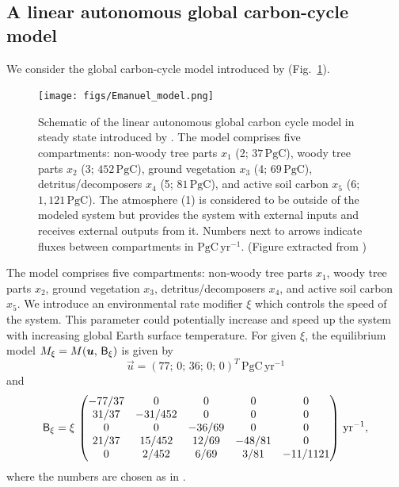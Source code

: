 \documentclass[smallextended]{svjour3}
\newcommand{\peta}{\mathrm{P}}
\newcommand{\gC}{\mathrm{gC}}
\newcommand{\yr}{\mathrm{yr}}
\newcommand{\transpose}{T}
\begin{document}
\subsection{A linear autonomous global carbon-cycle model}
\label{sec:example_1}
We consider the global carbon-cycle model introduced by \citet{Emanuel1981} (Fig.~\ref{fig:Emanuel_model}).
\begin{figure}%
    \centering
    \texttt{[image: figs/Emanuel\_model.png]}
    \caption{Schematic of the linear autonomous global carbon cycle model in steady state introduced by \citet{Emanuel1981}. 
      The model comprises five compartments: non-woody tree parts $x_1$ (2; $37\,\peta\gC$), woody tree parts $x_2$ (3; $452\,\peta\gC$), ground vegetation $x_3$ (4; $69\,\peta\gC$), detritus/decomposers $x_4$ (5; $81\,\peta\gC$), and active soil carbon $x_5$ (6; $1,121\,\peta\gC$). The atmosphere (1) is considered to be outside of the modeled system but provides the system with external inputs and receives external outputs from it. Numbers next to arrows indicate fluxes between compartments in $\peta\gC\,\yr^{-1}$. (Figure extracted from \citealt{Emanuel1981})}\label{fig:Emanuel_model}
\end{figure}
The model comprises five compartments: non-woody tree parts $x_1$, woody tree parts $x_2$, ground vegetation $x_3$, detritus/decomposers $x_4$, and active soil carbon $x_5$.
We introduce an environmental rate modifier $\xi$ which controls the speed of the system.
This parameter could potentially increase and speed up the system with increasing global Earth surface temperature.
For given $\xi$, the equilibrium model $M_\xi=M(\vec{u},\,\tens{B}_\xi)$ is given by
\begin{equation*}
  \vec{u} = (77;\,0;\,36;\,0;\,0)^{\transpose}\, \peta\gC\,\yr^{-1}
\end{equation*}
and
\begin{equation*}
    \tens{B}_\xi = \xi\,\left(\begin{matrix}
      -77/37 &       0 &      0 &      0 & 	  0\\
       31/37 & -31/452 &      0 &      0 & 	  0\\
	   0 &       0 & -36/69 &      0 & 	  0\\
       21/37 &  15/452 &  12/69 & -48/81 & 	  0\\
	   0 &   2/452 &   6/69 &   3/81 & -11/1121
	 \end{matrix}\right)\,\yr^{-1},
\end{equation*}
where the numbers are chosen as in \citet{Thompson1999GCB}. 
\end{document}
